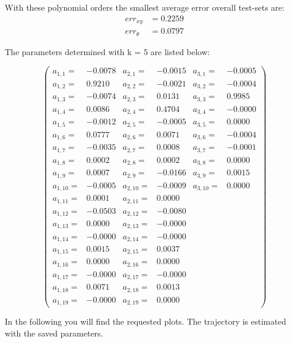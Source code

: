 \documentclass[conference]{IEEEtran}
\begin{document}
\begin{compactenum}[a)]
With these polynomial orders the smallest average error overall test-sets are:
\begin{align}
	err_{xy} & = 0.2259\\
	err_{\theta} & = 0.0797
\end{align}

The parameters determined with k = 5 are listed below:

$$
\left(
\scriptscriptstyle{
\begin{smallmatrix}
a_{1,1} =&   -0.0078&	a_{2,1} =&   -0.0015&	a_{3,1} =&  -0.0005 \\
a_{1,2} =&    0.9210&	a_{2,2} =&   -0.0021&	a_{3,2} =&	-0.0004	\\
a_{1,3} =&   -0.0074& 	a_{2,3} =&    0.0131&	a_{3,3} =&	 0.9985	\\
a_{1,4} =&    0.0086&	a_{2,4} =&    0.4704&	a_{3,4} =&	-0.0000	\\
a_{1,5} =&   -0.0012&	a_{2,5} =&   -0.0005&	a_{3,5} =&	 0.0000	\\
a_{1,6} =&    0.0777&	a_{2,6} =&    0.0071&	a_{3,6} =&	-0.0004	\\
a_{1,7} =&   -0.0035&	a_{2,7} =&    0.0008&	a_{3,7} =&	-0.0001	\\
a_{1,8} =&    0.0002&	a_{2,8} =&    0.0002&	a_{3,8} =&	 0.0000	\\
a_{1,9} =&    0.0007&	a_{2,9} =&   -0.0166&	a_{3,9} =&	 0.0015	\\
a_{1,10} =&   -0.0005&	a_{2,10} =&   -0.0009&	a_{3,10} =&	 0.0000	\\
a_{1,11} =&    0.0001&	a_{2,11} =&    0.0000	\\
a_{1,12} =&   -0.0503&	a_{2,12} =&   -0.0080	\\
a_{1,13} =&    0.0000&	a_{2,13} =&   -0.0000	\\
a_{1,14} =&   -0.0000&	a_{2,14} =&   -0.0000	\\
a_{1,15} =&    0.0015&	a_{2,15} =&    0.0037	\\
a_{1,16} =&    0.0000&	a_{2,16} =&    0.0000	\\
a_{1,17} =&   -0.0000&	a_{2,17} =&   -0.0000	\\
a_{1,18} =&    0.0071&	a_{2,18} =&    0.0013	\\
a_{1,19} =&   -0.0000&	a_{2,19} =&    0.0000	
\end{smallmatrix}}
\right)
$$
\item In the following you will find the requested plots. The trajectory is estimated with the saved parameters.

\end{compactenum}
\end{document}
